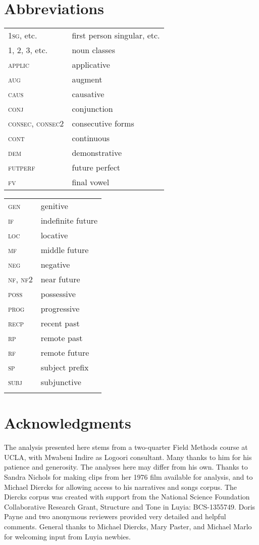 \documentclass[output=paper]{langsci/langscibook}
\begin{document}
\section*{Abbreviations}
\begin{tabularx}{.45\textwidth}{lX}
\textsc{1sg}, etc. &  first person singular, etc. \\
1, 2, 3, etc. & noun classes \\
\textsc{applic} & applicative \\
\textsc{aug}  &  augment\\
\textsc{caus} &   causative \\
\textsc{conj}   &  conjunction \\
\textsc{consec, consec2} &  consecutive forms \\
\textsc{cont}  &  continuous \\
\textsc{dem}  &  demonstrative \\
\textsc{futperf} & future    perfect \\
\textsc{fv}  &  final vowel \\
\end{tabularx}
\begin{tabularx}{.45\textwidth}{lX}
\textsc{gen}  &  genitive \\
\textsc{if}  &  indefinite future \\
\textsc{loc}  &  locative \\
\textsc{mf} &   middle future \\
\textsc{neg}  &  negative \\
\textsc{nf, nf2} & near future \\
\textsc{poss}  &  possessive \\
\textsc{prog}  &  progressive \\
\textsc{recp}  &  recent past \\
\textsc{rp}  &  remote past \\
\textsc{rf}  &  remote future \\
\textsc{sp}  &  subject prefix \\
\textsc{subj}   & subjunctive \\
 \\
\end{tabularx} 

\section*{Acknowledgments}

The analysis presented here stems from a two-quarter Field Methods course at UCLA, with Mwabeni Indire as Logoori consultant. Many thanks to him for his patience and generosity. The analyses here may differ from his own. Thanks to Sandra Nichols for making clips from her 1976 film available for analysis, and to Michael Diercks for allowing access to his narratives and songs corpus. The Diercks corpus was created with support from the National Science Foundation Collaborative Research Grant, Structure and Tone in Luyia: BCS-1355749. Doris Payne and two anonymous reviewers provided very detailed and helpful comments. General thanks to Michael Diercks, Mary Paster, and Michael Marlo for welcoming input from Luyia newbies.

\printbibliography[heading=subbibliography,notkeyword=this]
\end{document}
